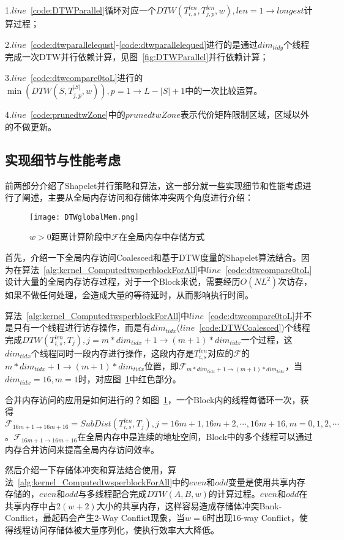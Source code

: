 1.$line$~\ref{code:DTWParallel}循环对应一个$DTW(T_{i,s}^{len},T_{j,p}^{len},w),len=1\to longest$计算过程；

2.$line$~\ref{code:dtwparallelequst}-\ref{code:dtwparallelequed}进行的是通过$dim_{tidy}$个线程完成一次DTW并行依赖计算，见图~\ref{fig:DTWParallel}并行依赖计算；

3.$line$~\ref{code:dtwcompare0toL}进行的$\min(DTW(S,T_{j,p}^{|S|},w)),p=1\to L-|S|+1$中的一次比较运算。

4.$line$~\ref{code:prunedtwZone}中的$prunedtwZone$表示代价矩阵限制区域，区域以外的不做更新。


\subsection{实现细节与性能考虑}
\label{cha:chap04:myalg:DTW:trick}
前两部分介绍了Shapelet并行策略和算法，这一部分就一些实现细节和性能考虑进行了阐述，主要从全局内存访问和存储体冲突两个角度进行介绍：

\begin{figure}[H] %
	\centering
	\texttt{[image: DTWglobalMem.png]}
	\caption{$w>0$距离计算阶段中$\mathcal{F}$在全局内存中存储方式}
	\label{fig:DTWglobalMem}
\end{figure}

首先，介绍一下全局内存访问Coalesced和基于DTW度量的Shapelet算法结合。因为在算法~\ref{alg:kernel_ComputedtwsperblockForAll}中$line$~\ref{code:dtwcompare0toL}设计大量的全局内存访存过程，对于一个Block来说，需要经历$O(NL^2)$次访存，如果不做任何处理，会造成大量的等待延时，从而影响执行时间。

算法~\ref{alg:kernel_ComputedtwsperblockForAll}中$line$~\ref{code:dtwcompare0toL}并不是只有一个线程进行访存操作，而是有$dim_{tidx}$($line$~\ref{code:DTWCoalesced})个线程完成$DTW(T_{i,s}^{len},T_j),j=m*dim_{tidx}+1\to (m+1)*dim_{tidx}$一个过程，这$dim_{tidx}$个线程同时一段内存进行操作，这段内存是$T_{i,s}^{len}$对应的$\mathcal{F}$的$m*dim_{tidx}+1\to (m+1)*dim_{tidx}$位置，即$\mathcal{F}_{m*dim_{tidx}+1\to (m+1)*dim_{tidx}}$，当$dim_{tidx}=16,m=1$时，对应图~\ref{fig:DTWglobalMem}中红色部分。

合并内存访问的应用是如何进行的？如图~\ref{fig:DTWglobalMem}，一个Block内的线程每循环一次，获得$\mathcal{F}_{16m+1\to16m+16}=SubDist(T_{i,s}^{len},T_j),j=16m+1,16m+2,\cdots,16m+16,m=0,1,2,\cdots$。$\mathcal{F}_{16m+1\to 16m+16}$在全局内存中是连续的地址空间，Block中的多个线程可以通过内存合并访问来提高全局内存访问效率。

然后介绍一下存储体冲突和算法结合使用，算法~\ref{alg:kernel_ComputedtwsperblockForAll}中的$even$和$odd$变量是使用共享内存存储的，$even$和$odd$与多线程配合完成$DTW(A,B,w)$的计算过程。$even$和$odd$在共享内存中占$2(w+2)$大小的共享内存，这样容易造成存储体冲突Bank-Conflict，最起码会产生2-Way Conflict现象，当$w=6$时出现16-way Conflict，使得线程访问存储体被大量序列化，使执行效率大大降低。

